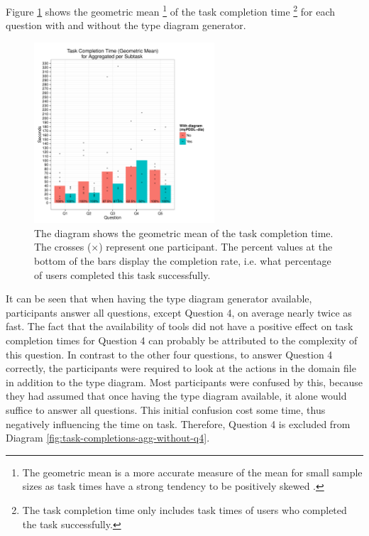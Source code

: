 \documentclass[a4paper,12pt]{report}
\begin{document}
\begin{enumerate}
Figure \ref{fig:task-completions-agg} shows the geometric mean \footnote{The geometric mean is a more accurate measure of the mean for
small sample sizes as task times have a strong tendency to be positively
skewed \cite{sauro2012quantifying}.}
of the task completion time \footnote{The task completion time only includes task times of users who
completed the task successfully.} for each question with and without
the type diagram generator.

  \begin{figure}[h]
    \centering
    \hspace{0.5cm}
    \includegraphics[width=0.6\textwidth]{task-completions-agg.pdf}
    \caption{The diagram shows the geometric mean of the task completion time.
             The crosses ($\times$) represent one participant.
The percent values at the bottom of the bars display the completion rate, i.e.
what percentage of users completed this task successfully.}
    \label{fig:task-completions-agg}
  \end{figure}

It can be seen that when having the type diagram generator available,
participants answer all questions, except Question 4, on average
nearly twice as fast. The fact that the availability of tools did not
have a positive effect on task completion times for Question 4 can
probably be attributed to the complexity of this question. In contrast
to the other four questions, to answer Question 4 correctly, the
participants were required to look at the actions in the domain file
in addition to the type diagram. Most participants were confused by
this, because they had assumed that once having the type diagram
available, it alone would suffice to answer all questions. This
initial confusion cost some time, thus negatively influencing the time
on task. Therefore, Question 4 is excluded from Diagram
\ref{fig:task-completions-agg-without-q4}.


\end{enumerate}
\end{document}
